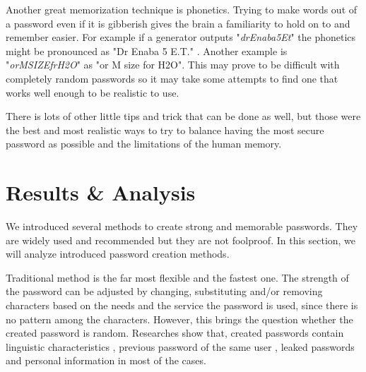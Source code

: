 \documentclass[acmsmall,nonacm]{acmart}
\begin{document}
Another great memorization technique is phonetics. Trying to make words out of a password even if it is gibberish gives the brain a familiarity to hold on to and remember easier. For example if a generator outputs "\emph{drEnaba5Et}" the phonetics might be pronounced as "Dr Enaba 5 E.T." \cite{rubenking_2021}. Another example is "\emph{orMSIZEfrH2O}" as "or M size for H2O". This may prove to be difficult with completely random passwords so it may take some attempts to find one that works well enough to be realistic to use.

There is lots of other little tips and trick that can be done as well, but those were the best and most realistic ways to try to balance having the most secure password as possible and the limitations of the human memory.

\section{Results \& Analysis} \label{results}

We introduced several methods to create strong and memorable passwords. They are widely used and recommended but they are not foolproof. In this section, we will analyze introduced password creation methods.

Traditional method is the far most flexible and the fastest one. The strength of the password can be adjusted by changing, substituting and/or removing characters based on the needs and the service the password is used, since there is no pattern among the characters. However, this brings the question whether the created password is random. Researches show that, created passwords contain linguistic characteristics \cite{curran_2011}, previous password of the same user \cite{bhagavatula_2020,10.5555/3235895.3235911,das_2014}, leaked passwords \cite{das_2014} and personal information \cite{siau_2018,tulek_2020} in most of the cases.
\end{document}
